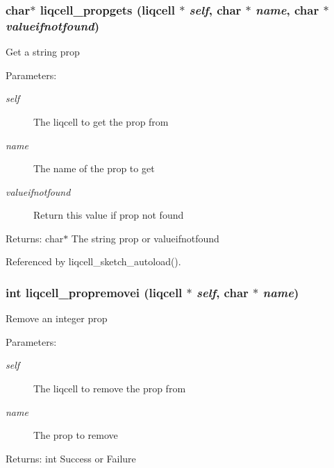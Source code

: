 \subsubsection[{liqcell\_\-propgets}]{\setlength{\rightskip}{0pt plus 5cm}char$\ast$ liqcell\_\-propgets (liqcell $\ast$ {\em self}, \/  char $\ast$ {\em name}, \/  char $\ast$ {\em valueifnotfound})}\label{d7/db4/liqcell__prop_8c_ab87e63e7cf949c5cb3e5f565cd7c45a}


Get a string prop \begin{Desc}
\item[Parameters:]
\begin{description}
\item[{\em self}]The liqcell to get the prop from \item[{\em name}]The name of the prop to get \item[{\em valueifnotfound}]Return this value if prop not found \end{description}
\end{Desc}
\begin{Desc}
\item[Returns:]char$\ast$ The string prop or valueifnotfound \end{Desc}


Referenced by liqcell\_\-sketch\_\-autoload().
\subsubsection[{liqcell\_\-propremovei}]{\setlength{\rightskip}{0pt plus 5cm}int liqcell\_\-propremovei (liqcell $\ast$ {\em self}, \/  char $\ast$ {\em name})}\label{d7/db4/liqcell__prop_8c_3e300caf2db00ee98fd4663a93073d23}


Remove an integer prop \begin{Desc}
\item[Parameters:]
\begin{description}
\item[{\em self}]The liqcell to remove the prop from \item[{\em name}]The prop to remove \end{description}
\end{Desc}
\begin{Desc}
\item[Returns:]int Success or Failure \end{Desc}
